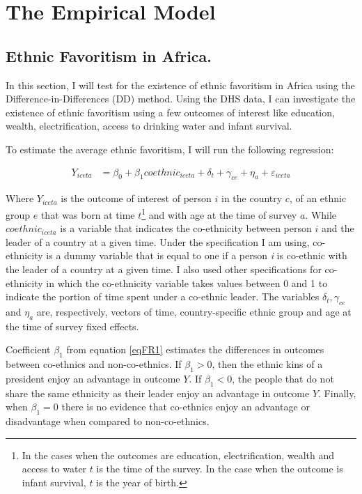 \documentclass{wptemp}
\begin{document}
\section{The Empirical Model}\label{sec4}
\subsection{Ethnic Favoritism in Africa.}
In this section, I will test for the existence of ethnic favoritism in Africa using the Difference-in-Differences (DD) method. Using the DHS data, I can investigate the existence of ethnic favoritism using a few outcomes of interest like education, wealth, electrification, access to drinking water and infant survival.

To estimate the average ethnic favoritism, I will run the following regression:

\begin{equation}\label{eqFR1}
\begin{split}
    Y_{iceta} &= \beta_{0} + \beta_{1}coethnic_{iceta}
    + \delta_{t} + \gamma_{ce} +\eta_{a}  + \varepsilon_{iceta}
\end{split}
\end{equation}

Where $Y_{iceta}$ is the outcome of interest of person $i$ in the country  $c$, of an ethnic group $e$ that was born at time $t$\footnote{In the cases when the outcomes are education, electrification, wealth and access to water $t$ is the time of the survey. In the case when the outcome is infant survival, $t$ is the year of birth.} and with age at the time of survey $a$. While $coethnic_{iceta}$ is a variable that indicates the co-ethnicity between person $i$ and the leader of a country at a given time. Under the specification I am using, co-ethnicity is a dummy variable that is equal to one if a person \textit{i} is co-ethnic with the leader of a country at a given time. I also used other specifications for co-ethnicity in which the co-ethnicity variable takes values between 0 and 1 to indicate the portion of time spent under a co-ethnic leader. The variables $\delta_{t}, \gamma_{ce}$ and $\eta_{a}$  are, respectively, vectors of time, country-specific ethnic group and age at the time of survey fixed effects.

Coefficient $\beta_{1}$ from equation \ref{eqFR1} estimates the differences in outcomes between co-ethnics and non-co-ethnics. If $\beta_{1} > 0$, then the ethnic kins of a president enjoy an advantage in outcome $Y$. If $\beta_{1} < 0$, the people that do not share the same ethnicity as their leader enjoy an advantage in outcome $Y$. Finally, when $\beta_{1} = 0$ there is no evidence that co-ethnics enjoy an advantage or disadvantage when compared to non-co-ethnics. 
\end{document}
